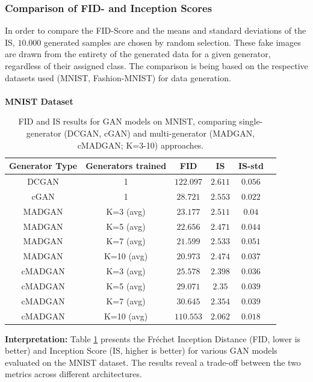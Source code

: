 \subsubsection[Question 1]{Comparison of FID- and Inception Scores}     \label{exp_results_ans_q1}
In order to compare the FID-Score and the means and standard deviations of the IS, $10.000$ generated samples are chosen by random selection. These fake images are drawn from the entirety of the generated data for a given generator, regardless of their assigned class.
The comparison is being based on the respective datasets used (MNIST, Fashion-MNIST) for data generation.\\
\\
\noindent\textbf{MNIST Dataset}
\begin{table}[H]
    \centering
    \begin{tabular}{|c|c|c|c|c|c|}
        \hline
        Generator Type & Generators trained & FID & IS & IS-std \\
        \hline
        DCGAN & 1 & $122.097$ & $\mathbf{2.611}$ & $0.056$ \\
        \hline
        cGAN & 1 & $28.721$ & $2.553$ & $0.022$ \\
        \hline
        MADGAN & K=3 (avg) & $23.177$ & $2.511$ & $0.04$ \\
        \hline
        MADGAN & K=5 (avg) & $22.656$ & $2.471$ & $0.044$ \\
        \hline
        MADGAN & K=7 (avg) & $21.599$ & $2.533$ & $0.051$ \\
        \hline
        MADGAN & K=10 (avg) & $\mathbf{20.973}$ & $2.474$ & $0.037$ \\
        \hline
        cMADGAN & K=3 (avg) & $25.578$ & $2.398$ & $0.036$ \\
        \hline
        cMADGAN & K=5 (avg) & $29.071$ & $2.35$ & $0.039$ \\
        \hline
        cMADGAN & K=7 (avg) & $30.645$ & $2.354$ & $0.039$ \\
        \hline
        cMADGAN & K=10 (avg) & $110.553$ & $2.062$ & $0.018$ \\
        \hline
    \end{tabular}
    \caption{FID and IS results for GAN models on MNIST, comparing single-generator (DCGAN, cGAN) and multi-generator (MADGAN, cMADGAN; K=3-10) approaches.}
    \label{tab:exp_mnist_fid_is}
\end{table}
\textbf{Interpretation:} Table \ref{tab:exp_mnist_fid_is} presents the Fréchet Inception Distance (FID, lower is better) and Inception Score (IS, higher is better) for various GAN models evaluated on the MNIST dataset. The results reveal a trade-off between the two metrics across different architectures.

